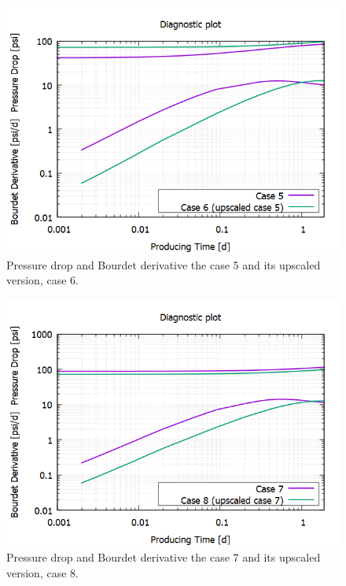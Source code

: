 \begin{figure}[H]
	\centering
	\includegraphics[width=0.8\linewidth]{Images/54}
	\caption{Pressure drop and Bourdet derivative the case 5 and its upscaled version, case 6.}
	\label{fig:54}
\end{figure}

\begin{figure}[H]
	\centering
	\includegraphics[width=0.8\linewidth]{Images/55}
	\caption{Pressure drop and Bourdet derivative the case 7 and its upscaled version, case 8.}
	\label{fig:55}
\end{figure}

